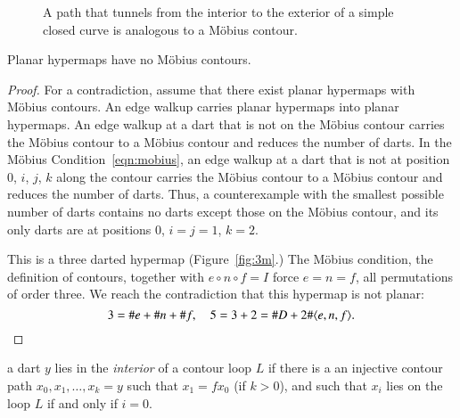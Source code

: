 \begin{figure}[htb]
  \centering
  \caption{A path that tunnels from the interior to the exterior
   of a simple closed curve
   is analogous to a M\"obius contour.}
  \label{fig:violate-jct}
\end{figure}






\begin{lemma}\label{lemma:no-mobius}  
Planar hypermaps have no M\"obius contours.
\end{lemma}

\begin{proof} For a contradiction, assume that there exist planar
hypermaps with M\"obius contours.  An edge walkup carries
planar hypermaps into planar hypermaps. An edge walkup
at a dart that is not on the M\"obius contour carries the
M\"obius contour to a M\"obius contour 
and reduces the number of darts.  
In the M\"obius Condition~\ref{eqn:mobius},
an edge walkup at a dart that is not at position $0$, $i$, $j$, $k$
along the contour carries the M\"obius contour to a M\"obius contour
and reduces the number of darts. Thus, a counterexample with
the smallest possible number of darts contains no
darts except those on the M\"obius contour, and its only darts
are at positions $0$, $i=j=1$, $k=2$.

This is a three darted hypermap (Figure~\ref{fig:3m}.)  
The M\"obius condition, the
definition of contours, together with $e\circ n\circ f=I$ force
$e=n=f$, all permutations of order three. We reach the contradiction
that this hypermap is not planar:
    $$3 = \# e + \# n + \# f,\quad 5 = 3+2 = \# D + 2 \#\langle e,n,f\rangle.$$
\end{proof}

\begin{definition}\label{def:interior} 
a dart $y$ lies in the {\it interior} of a contour
loop $L$ if there is a an injective contour path
$x_0,x_1,\ldots,x_k=y$ such that $x_1 = f x_0$ (if $k>0$), and
such that $x_i$ lies on the loop $L$ if and only if $i=0$.
\end{definition}

